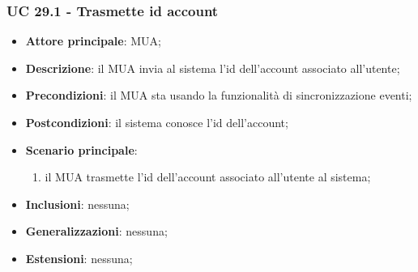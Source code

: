     \subsubsection{UC 29.1 - Trasmette id account} \label{sec:UC29.1}
    \begin{itemize}
        \item \textbf{Attore principale}: MUA;
        \item \textbf{Descrizione}: il MUA invia al sistema l'id dell'account associato all'utente;
        \item \textbf{Precondizioni}: il MUA sta usando la funzionalità di sincronizzazione eventi;
        \item \textbf{Postcondizioni}: il sistema conosce l'id dell'account;
        \item \textbf{Scenario principale}:
            \begin{enumerate}
                \item il MUA trasmette l'id dell'account associato all'utente al sistema;
            \end{enumerate}
        \item \textbf{Inclusioni}: nessuna;
        \item \textbf{Generalizzazioni}: nessuna;
        \item \textbf{Estensioni}: nessuna;
    \end{itemize}

